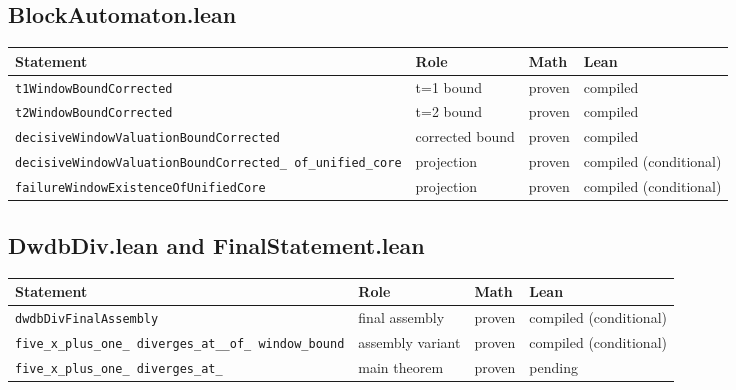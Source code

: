 \subsection{BlockAutomaton.lean}

\begin{center}
\small
\begin{tabular}{@{}p{}p{}p{}p{}@{}}
\toprule
Statement & Role & Math & Lean \\
\midrule
\texttt{t1WindowBoundCorrected} & t=1 bound & proven & compiled \\
\texttt{t2WindowBoundCorrected} & t=2 bound & proven & compiled \\
\texttt{decisiveWindowValuation\allowbreak BoundCorrected} &
  corrected bound & proven & compiled \\
\texttt{decisiveWindowValuationBoundCorrected\_\allowbreak
of\_\allowbreak unified\_\allowbreak core} & projection & proven &
  compiled (conditional) \\
\texttt{failureWindowExistenceOfUnifiedCore} & projection & proven &
  compiled (conditional) \\
\bottomrule
\end{tabular}
\end{center}

\subsection{DwdbDiv.lean and FinalStatement.lean}

\begin{center}
\small
\begin{tabular}{@{}p{}p{}p{}p{}@{}}
\toprule
Statement & Role & Math & Lean \\
\midrule
\texttt{dwdbDivFinalAssembly} & final assembly & proven &
  compiled (conditional) \\
\texttt{five\_\allowbreak x\_\allowbreak plus\_\allowbreak one\_\allowbreak
diverges\_\allowbreak at\_\allowbreak 7\_\allowbreak of\_\allowbreak
window\_\allowbreak bound} & assembly variant & proven &
  compiled (conditional) \\
\texttt{five\_\allowbreak x\_\allowbreak plus\_\allowbreak one\_\allowbreak
diverges\_\allowbreak at\_\allowbreak 7} & main theorem & proven &
  pending \\
\bottomrule
\end{tabular}
\end{center}

